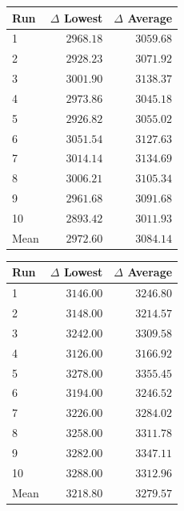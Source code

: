 \begin{table}[H]
    \centering
    \begin{minipage}[t]{0.48\textwidth}
        \centering
        \label{tab:gain-normal-square}
        \small
        \setlength{\tabcolsep}{4pt}
        \begin{tabular}{lrr}
            \toprule
            \textbf{Run} & \textbf{$\Delta$ Lowest} & \textbf{$\Delta$ Average} \\
            \midrule
            1 & $2968.18$ & $3059.68$ \\
            2 & $2928.23$ & $3071.92$ \\
            3 & $3001.90$ & $3138.37$ \\
            4 & $2973.86$ & $3045.18$ \\
            5 & $2926.82$ & $3055.02$ \\
            6 & $3051.54$ & $3127.63$ \\
            7 & $3014.14$ & $3134.69$ \\
            8 & $3006.21$ & $3105.34$ \\
            9 & $2961.68$ & $3091.68$ \\
            10 & $2893.42$ & $3011.93$ \\
            \midrule
            Mean & $2972.60$ & $3084.14$ \\
            \bottomrule
        \end{tabular}
    \end{minipage}
    \hfill
    \begin{minipage}[t]{0.48\textwidth}
        \centering
        \label{tab:gain-binary-square}
        \small
        \setlength{\tabcolsep}{4pt}
        \begin{tabular}{lrr}
            \toprule
            \textbf{Run} & \textbf{$\Delta$ Lowest} & \textbf{$\Delta$ Average} \\
            \midrule
            1 & $3146.00$ & $3246.80$ \\
            2 & $3148.00$ & $3214.57$ \\
            3 & $3242.00$ & $3309.58$ \\
            4 & $3126.00$ & $3166.92$ \\
            5 & $3278.00$ & $3355.45$ \\
            6 & $3194.00$ & $3246.52$ \\
            7 & $3226.00$ & $3284.02$ \\
            8 & $3258.00$ & $3311.78$ \\
            9 & $3282.00$ & $3347.11$ \\
            10 & $3288.00$ & $3312.96$ \\
            \midrule
            Mean & $3218.80$ & $3279.57$ \\
            \bottomrule
        \end{tabular}
    \end{minipage}
\end{table}

